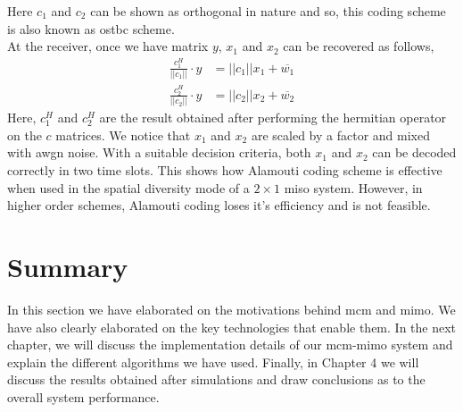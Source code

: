 Here $c_1$ and $c_2$ can be shown as orthogonal in nature and so, this coding scheme is also known as \acrlong{ostbc} scheme.\\
At the receiver, once we have matrix $y$, $x_1$ and $x_2$ can be recovered as follows,
\begin{align*}
\frac{c_1^H}{||c_1||} \cdot y &= ||c_1||x_1 + \overline{w_1}\\
\frac{c_2^H}{||c_2||} \cdot y &= ||c_2||x_2 + \overline{w_2}
\end{align*}
Here, $c_1^H$ and $c_2^H$ are the result obtained after performing the hermitian operator on the $c$ matrices. We notice that $x_1$ and $x_2$ are scaled by a factor and mixed with \acrshort{awgn} noise. With a suitable decision criteria, both $x_1$ and $x_2$ can be decoded correctly in two time slots. This shows how Alamouti coding scheme is effective when used in the \gls{spatial diversity} mode of a $2 \times 1$ \acrshort{miso} system. However, in higher order schemes, Alamouti coding loses it's efficiency and is not feasible.

\section*{Summary}
In this section we have elaborated on the motivations behind \acrshort{mcm} and \acrshort{mimo}. We have also clearly elaborated on the key technologies that enable them. In the next chapter, we will discuss the implementation details of our \acrshort{mcm}-\acrshort{mimo} system and explain the different algorithms we have used. Finally, in Chapter 4 we will discuss the results obtained after simulations and draw conclusions as to the overall system performance.  
